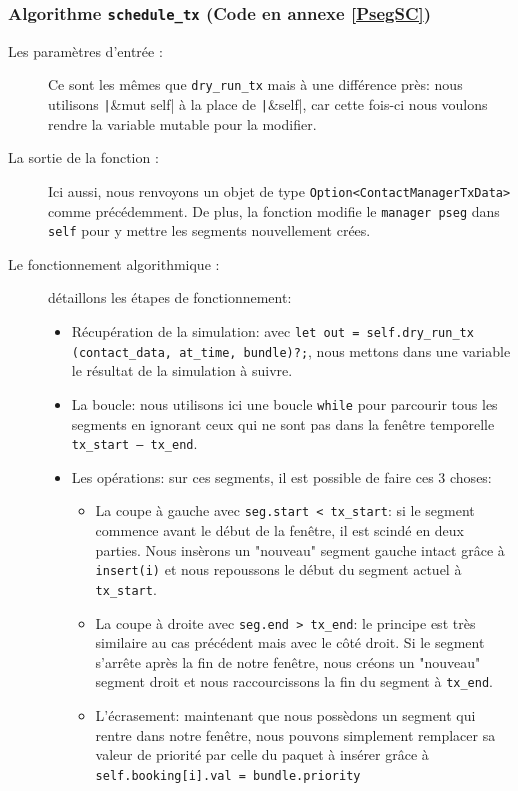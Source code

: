 \documentclass{article}
\begin{document}
\subsubsection*{Algorithme \texttt{schedule\_tx} \label{CodeSCpseg} (Code en annexe \ref{PsegSC})}
\begin{description}
    \item[Les paramètres d'entrée :]
    Ce sont les mêmes que \texttt{dry\_run\_tx} mais à une différence près: nous utilisons \texttt|&mut self| à la place de \texttt|&self|,
    car cette fois-ci nous voulons rendre la variable mutable pour la modifier.
    \item[La sortie de la fonction :] 
    Ici aussi, nous renvoyons un objet de type \texttt{Option<ContactManagerTxData>} comme précédemment. De plus, la fonction modifie le \texttt{manager pseg} dans \texttt{self}
    pour y mettre les segments nouvellement crées.
    \item[Le fonctionnement algorithmique :] détaillons les étapes de fonctionnement:
    \begin{itemize}
        \item Récupération de la simulation: avec \texttt{let out = self.dry_run_tx} \texttt{(contact_data, at_time, bundle)?;}, 
        nous mettons dans une variable le résultat de la simulation à suivre.
        \item La boucle: nous utilisons ici une boucle \texttt{while} pour parcourir tous les segments en ignorant ceux qui ne sont pas dans la fenêtre temporelle
        \texttt{tx\_start -- tx\_end}.
        \item Les opérations: sur ces segments, il est possible de faire ces 3 choses:
        \begin{itemize}
            \item La coupe à gauche avec \texttt{seg.start < tx_start}: si le segment commence avant le début de la fenêtre, il est scindé en deux parties.
            Nous insèrons un "nouveau" segment gauche intact grâce à \texttt{insert(i)} et nous repoussons le début du segment actuel à \texttt{tx\_start}.
            \item La coupe à droite avec \texttt{seg.end > tx_end}: le principe est très similaire au cas précédent mais avec le côté droit. Si le segment s'arrête après la fin de notre fenêtre,
            nous créons un "nouveau" segment droit et nous raccourcissons la fin du segment à \texttt{tx\_end}.
            \item L'écrasement: maintenant que nous possèdons un segment qui rentre dans notre fenêtre, nous pouvons simplement remplacer sa valeur de priorité par celle du paquet à insérer grâce à \\ \texttt{self.booking[i].val = bundle.priority}

\end{itemize}
\end{itemize}
\end{description}
\end{document}
